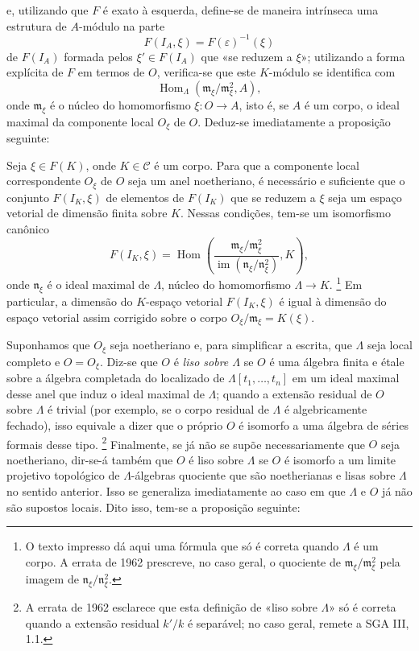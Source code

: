 e, utilizando que $F$ é exato à esquerda, define-se de maneira
intrínseca uma estrutura de $A$-módulo na parte
\[
  F(I_A,\xi)=F(\varepsilon)^{-1}(\xi)
\]
de $F(I_A)$ formada pelos $\xi'\in F(I_A)$ que «se reduzem a $\xi$»;
utilizando a forma explícita de $F$ em termos de $O$, verifica-se que este
$K$-módulo se identifica com
\[
  \operatorname{Hom}_{\Lambda}(\mathfrak m_\xi/\mathfrak m_\xi^2,A),
\]
onde $\mathfrak m_\xi$ é o núcleo do homomorfismo
$\xi:O\longrightarrow A$, isto é, se $A$ é um corpo, o ideal maximal da
componente local $O_\xi$ de $O$. Deduz-se imediatamente a proposição
seguinte:

 Seja $\xi\in F(K)$, onde $K\in\mathcal C$ é um
corpo. Para que a componente local correspondente $O_\xi$ de $O$ seja um
anel noetheriano, é necessário e suficiente que o conjunto $F(I_K,\xi)$ de
elementos de $F(I_K)$ que se reduzem a $\xi$ seja um espaço vetorial
de dimensão finita sobre $K$. Nessas condições, tem-se um isomorfismo
canônico
\[
  F(I_K,\xi)=
  \operatorname{Hom}\!\left(
    \frac{\mathfrak m_\xi/\mathfrak m_\xi^2}
         {\operatorname{im}(\mathfrak n_\xi/\mathfrak n_\xi^2)},K
  \right),
\]
onde $\mathfrak n_\xi$ é o ideal maximal de $\Lambda$, núcleo do
homomorfismo $\Lambda\longrightarrow K$.
\footnote{O texto impresso dá aqui uma fórmula que só é correta quando
$\Lambda$ é um corpo. A errata de 1962 prescreve, no caso geral,
o quociente de $\mathfrak m_\xi/\mathfrak m_\xi^2$ pela imagem de
$\mathfrak n_\xi/\mathfrak n_\xi^2$.}
Em particular, a dimensão do $K$-espaço vetorial $F(I_K,\xi)$ é igual à
dimensão do espaço vetorial assim corrigido sobre o corpo
$O_\xi/\mathfrak m_\xi=K(\xi)$.

Suponhamos que $O_\xi$ seja noetheriano e, para simplificar a escrita, que
$\Lambda$ seja local completo e $O=O_\xi$. Diz-se que $O$ é \emph{liso sobre
$\Lambda$} se $O$ é uma álgebra finita e étale sobre a álgebra completada do
localizado de $\Lambda[t_1,\ldots,t_n]$ em um ideal maximal desse anel que
induz o ideal maximal de $\Lambda$; quando a extensão residual de $O$ sobre
$\Lambda$ é trivial (por exemplo, se o corpo residual de $\Lambda$ é
algebricamente fechado), isso equivale a dizer que o próprio $O$ é isomorfo a uma
álgebra de séries formais desse tipo.
\footnote{A errata de 1962 esclarece que esta definição de «liso sobre
$\Lambda$» só é correta quando a extensão residual $k'/k$ é separável;
no caso geral, remete a SGA III, 1.1.}
Finalmente, se já não se supõe necessariamente que $O$ seja noetheriano, dir-se-á
também que $O$ é liso sobre $\Lambda$ se $O$ é isomorfo a um limite
projetivo topológico de $\Lambda$-álgebras quociente que são noetherianas e
lisas sobre $\Lambda$ no sentido anterior. Isso se generaliza imediatamente ao caso
em que $\Lambda$ e $O$ já não são supostos locais. Dito isso, tem-se a
proposição seguinte:

